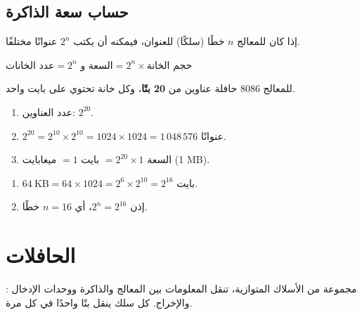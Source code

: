 \subsection{حساب سعة الذاكرة}
إذا كان للمعالج $n$ خطًا (سلكًا) للعنوان، فيمكنه أن يكتب $2^n$ عنوانًا مختلفًا.

\begin{tarif}
    $\text{عدد الخانات} = 2^{n}$ \qquad و\qquad
    $\text{السعة} = 2^{n} \times \text{حجم الخانة}$
\end{tarif}

\begin{khatwa}
    للمعالج \textenglish{8086} حافلة عناوين من \textbf{20 بتًا}، وكل خانة تحتوي على بايت واحد.
    \begin{enumerate}
        \item عدد العناوين: $2^{20}$.
        \item $2^{20} = 2^{10} \times 2^{10} = 1024 \times 1024 = 1\,048\,576$ عنوانًا.
        \item السعة $= 2^{20} \times 1$ بايت $= 1$ ميغابايت \textenglish{(1 MB)}.
    \end{enumerate}
\end{khatwa}

\begin{khatwa}
    \begin{enumerate}
        \item $64\ \text{KB} = 64 \times 1024 = 2^{6} \times 2^{10} = 2^{16}$ بايت.
        \item إذن $2^{n} = 2^{16}$، أي $n = 16$ خطًا.
    \end{enumerate}
\end{khatwa}

\section{الحافلات}

\begin{tarif}
    : مجموعة من الأسلاك المتوازية، تنقل المعلومات بين المعالج
    والذاكرة ووحدات الإدخال والإخراج. كل سلك ينقل بتًا واحدًا في كل مرة.
\end{tarif}


